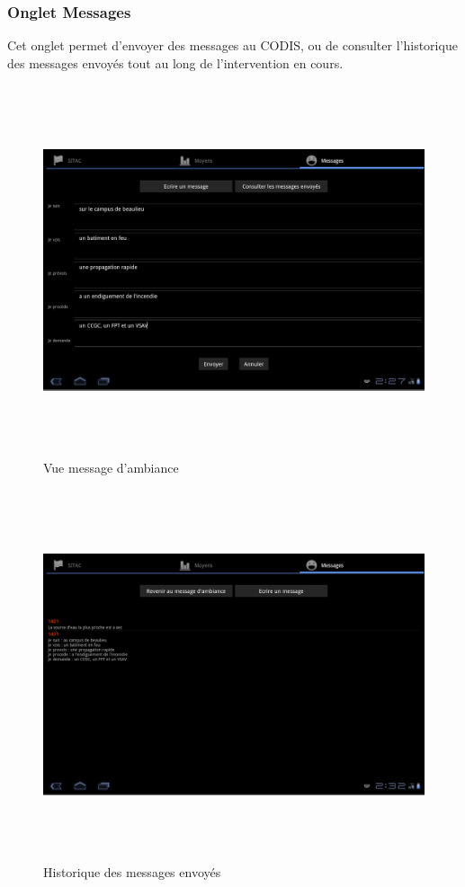 \documentclass{article}
\begin{document}
\subsubsection{Onglet Messages}

Cet onglet permet d'envoyer des messages au CODIS, ou de consulter 
l'historique des messages envoyés tout au long de l'intervention en cours.

\begin{figure}[htbp]
\begin{center}
\includegraphics[width=487pt, height=309pt]{Manueldutilisation-fig003.png}
\caption{Vue message d'ambiance}
\end{center}
\end{figure}

\begin{figure}[htbp]
\begin{center}
\includegraphics[width=487pt, height=309pt]{Manueldutilisation-fig004.png}
\caption{Historique des messages envoyés}
\end{center}
\end{figure}
\end{document}
